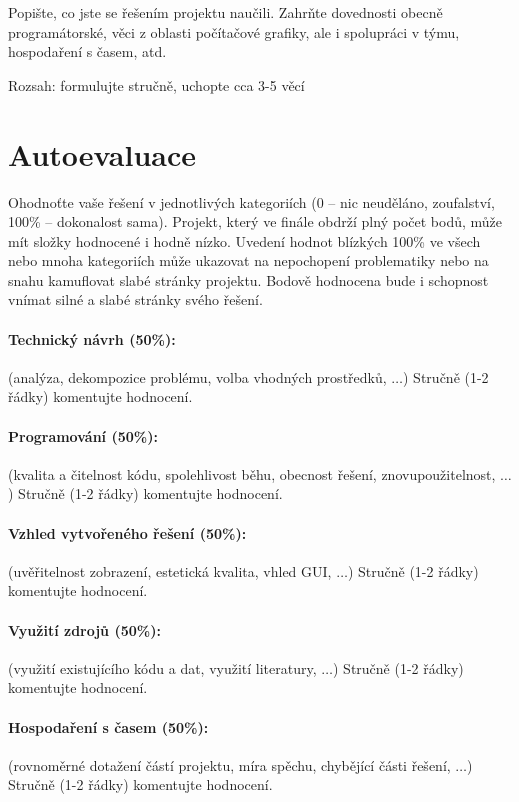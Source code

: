 \documentclass[11pt,a4paper]{article}
\begin{document}
Popište, co jste se řešením projektu naučili. Zahrňte dovednosti obecně
programátorské, věci z oblasti počítačové grafiky, ale i spolupráci v týmu,
hospodaření s časem, atd.

Rozsah: formulujte stručně, uchopte cca 3-5 věcí

\section{Autoevaluace}

Ohodnoťte vaše řešení v jednotlivých kategoriích (0 – nic neuděláno,
zoufalství, 100\% – dokonalost sama). Projekt, který ve finále obdrží plný
počet bodů, může mít složky hodnocené i hodně nízko. Uvedení hodnot blízkých
100\% ve všech nebo mnoha kategoriích může ukazovat na nepochopení problematiky
nebo na snahu kamuflovat slabé stránky projektu. Bodově hodnocena bude i
schopnost vnímat silné a slabé stránky svého řešení.

\paragraph{Technický návrh (50\%):} (analýza, dekompozice problému, volba
vhodných prostředků, $\ldots$) 
Stručně (1-2 řádky) komentujte hodnocení. 

\paragraph{Programování (50\%):} (kvalita a čitelnost kódu, spolehlivost běhu,
obecnost řešení, znovupoužitelnost, $\ldots$)
Stručně (1-2 řádky) komentujte hodnocení. 

\paragraph{Vzhled vytvořeného řešení (50\%):} (uvěřitelnost zobrazení,
estetická kvalita, vhled GUI, $\ldots$)
Stručně (1-2 řádky) komentujte hodnocení. 

\paragraph{Využití zdrojů (50\%):} (využití existujícího kódu a dat, využití
literatury, $\ldots$)
Stručně (1-2 řádky) komentujte hodnocení. 

\paragraph{Hospodaření s časem (50\%):} (rovnoměrné dotažení částí projektu,
míra spěchu, chybějící části řešení, $\ldots$)
Stručně (1-2 řádky) komentujte hodnocení. 
\end{document}
